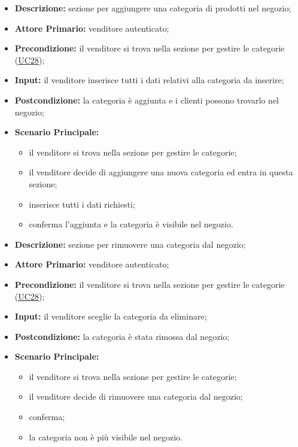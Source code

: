         \begin{itemize}
            \item \textbf{Descrizione:} sezione per aggiungere una categoria di prodotti nel negozio;
            \item \textbf{Attore Primario:} venditore autenticato;
            \item \textbf{Precondizione:} il venditore si trova nella sezione per gestire le categorie (\hyperref[sec:UC28]{\underline{UC28}});
            \item \textbf{Input:} il venditore inserisce tutti i dati relativi alla categoria da inserire;
            \item \textbf{Postcondizione:} la categoria è aggiunta e i clienti possono trovarlo nel negozio;
            \item \textbf{Scenario Principale:} 
                \begin{itemize}
                    \item il venditore si trova nella sezione per gestire le categorie;
                    \item il venditore decide di aggiungere una nuova categoria ed entra in questa sezione;
                    \item inserisce tutti i dati richiesti;
                    \item conferma l'aggiunta e la categoria è visibile nel negozio.
                \end{itemize}
        \end{itemize}
        \begin{itemize}
            \item \textbf{Descrizione:} sezione per rimuovere una categoria dal negozio;
            \item \textbf{Attore Primario:} venditore autenticato;
            \item \textbf{Precondizione:} il venditore si trova nella sezione per gestire le categorie (\hyperref[sec:UC28]{\underline{UC28}});
            \item \textbf{Input:} il venditore sceglie la categoria da eliminare;
            \item \textbf{Postcondizione:} la categoria è stata rimossa dal negozio;
            \item \textbf{Scenario Principale:} 
                \begin{itemize}
                    \item il venditore si trova nella sezione per gestire le categorie;
                    \item il venditore decide di rimuovere una categoria dal negozio;
                    \item conferma;
                    \item la categoria non è più visibile nel negozio.
                \end{itemize}
        \end{itemize}

